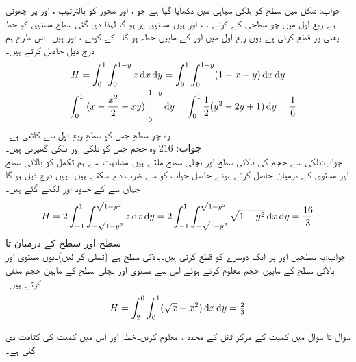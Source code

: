 جواب: شکل  میں سطح  کو ہلکی سیاہی میں دکھایا گیا ہے جو ،  اور محور  کو بالترتیب ،  اور  پر چھوتی ہے۔ربع اول میں چو سطحی کے کونے ، ،  اور  ہیں۔مستوی  پر  ہو گا لہٰذا دی گئی سطح  مستوی کو  خط  یعنی  پر قطع کرتی ہے۔یوں ربع اول میں  اور   کے مابین خطہ  ہو گا۔ کے کونے ،  اور  ہیں۔ اس طرح ہم درج ذیل حاصل کرتے ہیں۔
\begin{multline*}
H=\int_0^1\int_0^{1-y} z\dif x\dif y=\int_0^1\int_0^{1-y} (1-x-y)\dif x\dif y\\
=\int_0^1 \left.(x-\frac{x^2}{2}-xy)\right|_0^{1-y}\dif y=\int_0^1 \frac{1}{2}(y^2-2y+1)\dif y=\frac{1}{6}
\end{multline*}
وہ چو سطح جس کو سطح  ربع اول سے کاٹتی ہے۔\\
جواب:\quad 
 $216$
وہ حجم جس کو نلکی  اور نلکی  گھیرتی ہیں۔\\
جواب:نلکی  سے حجم کی بالائی سطح  اور نچلی سطح  ملتے ہیں۔مشابہت سے ہم تکمل کو بالائی سطح اور  مستوی کے درمیان حاصل کرتے ہوئے حاصل جواب کو  سے ضرب دے سکتے ہیں۔ یوں درج ذیل ہو گا جہاں  سے  کے حدود  اور  لکھے گئے ہیں۔
\begin{align*}
H=2\int_{-1}^{1}\int_{-\sqrt{1-y^2}}^{\sqrt{1-y^2}}z\dif x\dif y=2\int_{-1}^{1}\int_{-\sqrt{1-y^2}}^{\sqrt{1-y^2}}\sqrt{1-y^2}\dif x\dif y=\frac{16}{3}
\end{align*}
سطح  اور سطح  کے درمیان  تا \\
جواب:یہ سطحیں  اور  پر ایک دوسرے کو قطع کرتی ہیں۔بالائی سطح  ہے (تسلی کر لیں)۔یوں  مستوی اور بالائی سطح کے مابین حجم معلوم کرتے ہوئے اس سے  مستوی اور نچلی سطح کے مابین حجم منفی کرتے ہیں۔
\begin{align*}
H=\int_{2}^{0}\int_{0}^{1} (\sqrt{x}-x^2)\dif x\dif y=\tfrac{2}{3}
\end{align*}

سوال  تا سوال  میں کمیت کے مرکز ثقل کے محدد ،  معلوم کریں۔خطہ  اور اس میں کمیت کی کثافت  دی گئی ہے۔

